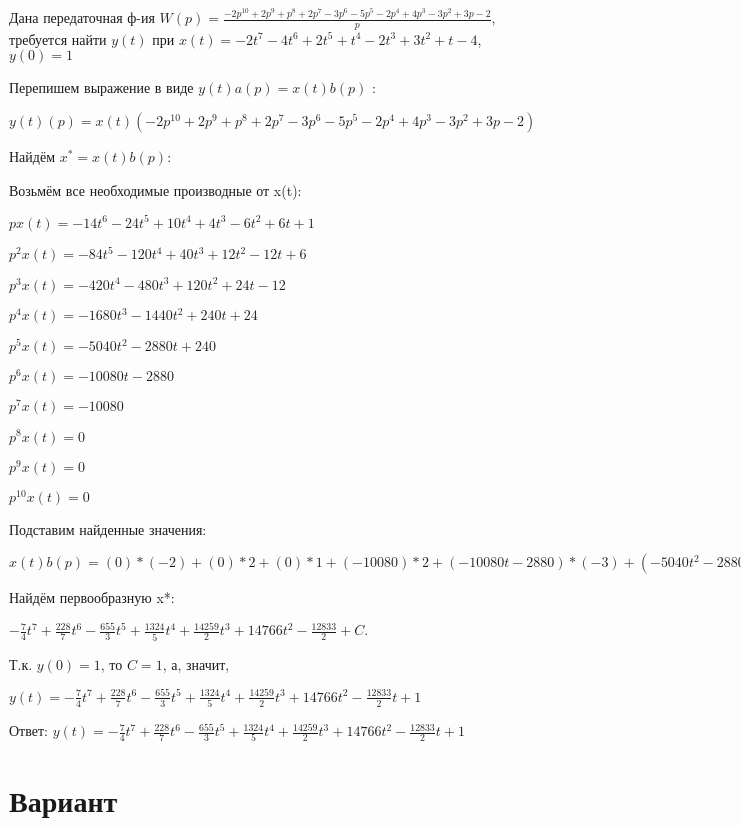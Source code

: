 \documentclass{article}
\begin{document}
{{{{{Дана передаточная ф-ия $W(p)=\frac{-2p^{10}+2p^{9}+p^{8}+2p^{7}-3p^{6}-5p^{5}-2p^{4}+4p^{3}-3p^{2}+3p-2}{p}$, требуется найти $y(t)$ при $x(t)=-2t^{7}-4t^{6}+2t^{5}+t^{4}-2t^{3}+3t^{2}+t-4$, $y(0)=1$

Перепишем выражение в виде $y(t)a(p)=x(t)b(p)$ :

$y(t)(p)=x(t)(-2p^{10}+2p^{9}+p^{8}+2p^{7}-3p^{6}-5p^{5}-2p^{4}+4p^{3}-3p^{2}+3p-2)$

Найдём $x^*=x(t)b(p)$:

Возьмём все необходимые производные от x(t):

$px(t)=-14t^{6}-24t^{5}+10t^{4}+4t^{3}-6t^{2}+6t+1$

$p^2x(t)=-84t^{5}-120t^{4}+40t^{3}+12t^{2}-12t+6$

$p^3x(t)=-420t^{4}-480t^{3}+120t^{2}+24t-12$

$p^4x(t)=-1680t^{3}-1440t^{2}+240t+24$

$p^5x(t)=-5040t^{2}-2880t+240$

$p^6x(t)=-10080t-2880$

$p^7x(t)=-10080$

$p^8x(t)=0$

$p^9x(t)=0$

$p^10x(t)=0$

Подставим найденные значения:

$x(t)b(p) = (0)*(-2)+(0)*2+(0)*1+(-10080)*2+(-10080t-2880)*(-3)+(-5040t^{2}-2880t+240)*(-5)+(-1680t^{3}-1440t^{2}+240t+24)*(-2)+(-420t^{4}-480t^{3}+120t^{2}+24t-12)*4+(-84t^{5}-120t^{4}+40t^{3}+12t^{2}-12t+6)*(-3)+(-14t^{6}-24t^{5}+10t^{4}+4t^{3}-6t^{2}+6t+1)*3+(-14t^{6}-24t^{5}+10t^{4}+4t^{3}-6t^{2}+6t+1)*(-2)=-14t^{6}+228t^{5}-1310t^{4}+1324t^{3}+28518t^{2}+44298t$





Найдём первообразную x*:

$-\frac{7}{4}t^{7}+\frac{228}{7}t^{6}-\frac{655}{3}t^{5}+\frac{1324}{5}t^{4}+\frac{14259}{2}t^{3}+14766t^{2}-\frac{12833}{2}+C.$

Т.к. $y(0)=1$, то $C=1$, а, значит, 

$y(t)=-\frac{7}{4}t^{7}+\frac{228}{7}t^{6}-\frac{655}{3}t^{5}+\frac{1324}{5}t^{4}+\frac{14259}{2}t^{3}+14766t^{2}-\frac{12833}{2}t+1$

Ответ: $y(t) = -\frac{7}{4}t^{7}+\frac{228}{7}t^{6}-\frac{655}{3}t^{5}+\frac{1324}{5}t^{4}+\frac{14259}{2}t^{3}+14766t^{2}-\frac{12833}{2}t+1$

\section{Вариант}

}}}}}
\end{document}

